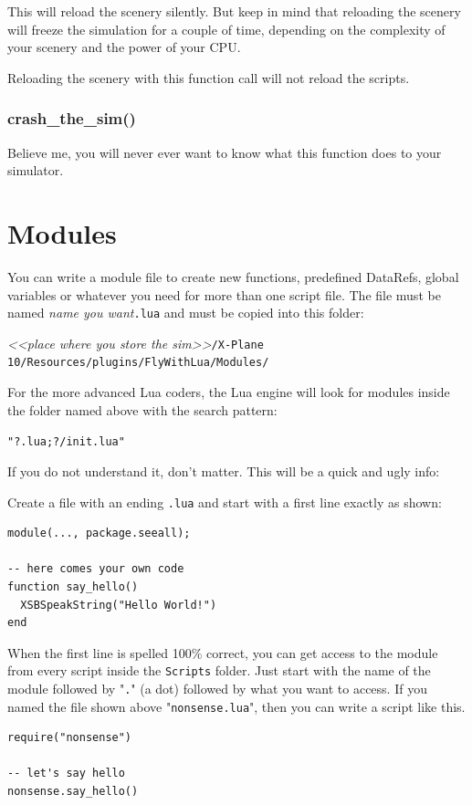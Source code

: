 \documentclass[11pt,parskip=half,a4paper]{scrartcl}
\begin{document}
This will reload the scenery silently. But keep in mind that reloading the scenery will freeze the simulation for a couple of time, depending on the complexity of your scenery and the power of your CPU.

Reloading the scenery with this function call will not reload the scripts.


\subsubsection{crash\_the\_sim()}

Believe me, you will never ever want to know what this function does to your simulator.

\newpage
\section{Modules}

You can write a module file to create new functions, predefined DataRefs, global variables or whatever you need for more than one script file. The file must be named \emph{name you want}\verb|.lua| and must be copied into this folder:

\emph{<<place where you store the sim>>}\verb|/X-Plane 10/Resources/plugins/FlyWithLua/Modules/|

For the more advanced Lua coders, the Lua engine will look for modules inside the folder named above with the search pattern:

\verb|"?.lua;?/init.lua"|

If you do not understand it, don't matter. This will be a quick and ugly info:

Create a file with an ending \verb|.lua| and start with a first line exactly as shown:

\begin{lstlisting}
module(..., package.seeall);

-- here comes your own code
function say_hello()
  XSBSpeakString("Hello World!")
end
\end{lstlisting}

When the first line is spelled 100\% correct, you can get access to the module from every script inside the \verb|Scripts| folder. Just start with the name of the module followed by "\verb|.|" (a dot) followed by what you want to access. If you named the file shown above "\verb|nonsense.lua|", then you can write a script like this.

\begin{lstlisting}
require("nonsense")

-- let's say hello
nonsense.say_hello()
\end{lstlisting}
\end{document}
